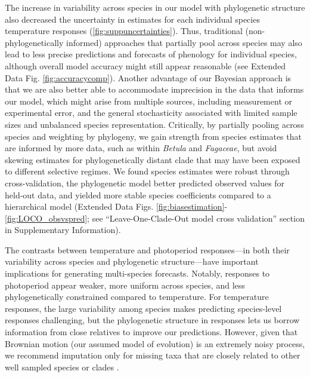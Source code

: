 \documentclass[11pt]{article}
\begin{document}
\par The increase in variability across species in our model with phylogenetic structure also decreased the uncertainty in estimates for each individual species temperature responses (\ref{fig:suppuncertainties}). Thus, traditional (non-phylogenetically informed) approaches that partially pool across species  \cite[most hierarchical models in ecology, e.g.,][]{flynn2018,ettinger2020} may also lead to less precise predictions and forecasts of phenology for individual species, although overall model accuracy might still appear reasonable (see Extended Data Fig. \ref{fig:accuracycomp}). Another advantage of our Bayesian approach is that we are also better able to accommodate imprecision in the data that informs our model, which might arise from multiple sources, including measurement or experimental error, and the general stochasticity associated with limited sample sizes and unbalanced species representation. Critically, by partially pooling across species and weighting by phylogeny, we gain strength from species estimates that are informed by more data, such as within \emph{Betula} and \emph{Fagaceae}, but avoid skewing estimates for phylogenetically distant clade that may have been exposed to different selective regimes. We found species estimates were robust through cross-validation, the phylogenetic model better predicted observed values for held-out data, and yielded more stable species coefficients compared to a hierarchical model (Extended Data Figs. \ref{fig:biasestimation}-\ref{fig:LOCO_obsvspred}; see ``Leave-One-Clade-Out model cross validation'' section in Supplementary Information). 

\par The contrasts between temperature and photoperiod responses---in both their variability across species and phylogenetic structure---have important implications for generating multi-species forecasts. Notably, responses to photoperiod appear weaker, more uniform across species, and less phylogenetically constrained compared to temperature. For temperature responses, the large variability among species makes predicting species-level  responses challenging, but the phylogenetic structure in responses lets us borrow information from close relatives to improve our predictions. However, given that Brownian motion (our assumed model of evolution) is an extremely noisy process, we recommend imputation only for missing taxa that are closely related to other well sampled species or clades \citep{molina2018assessing,molina2023unreliable}.
\end{document}
